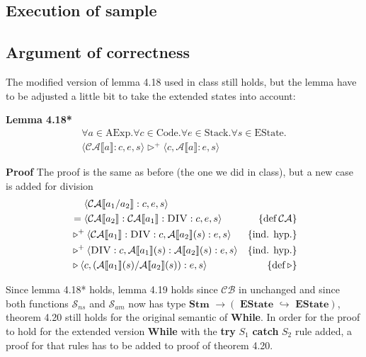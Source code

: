 \documentclass[11pt,oneside,a4paper]{article}
\newenvironment{changemargin}[2]{%
\begin{list}{}{%
\setlength{\topsep}{0pt}%
\setlength{\leftmargin}{#1}%
\setlength{\rightmargin}{#2}%
\setlength{\listparindent}{\parindent}%
\setlength{\itemindent}{\parindent}%
\setlength{\parsep}{\parskip}%
}%
\item[]}{\end{list}}
\begin{document}
\subsection*{Execution of sample}
\begin{changemargin}{-3.4cm}{\rightmargin}
\noindent
\tiny

\normalsize
%
\end{changemargin}

\subsection*{Argument of correctness}
The modified version of lemma 4.18 used in class still holds, 
but the lemma have to be adjusted a little bit to take the 
extended states into account:

{\bf Lemma 4.18*} 
\begin{align*}
\forall a \in \text{AExp}.\forall c \in \text{Code}.\forall e \in \text{Stack}.
\forall s \in \text{EState}. \\
\langle\mathcal{CA}\llbracket a \rrbracket:c, e, s \rangle \triangleright^+ 
\langle c, \mathcal{A}\llbracket a \rrbracket:e, s \rangle
\end{align*}

{\bf Proof}
The proof is the same as before (the one we did in class), 
but a new case is added for division
\begin{align*}
[a \equiv a_1 / a_2]&\:\:\:\:\:\: \langle \mathcal{CA}\llbracket a_1 / a_2 \rrbracket:c,
e, s \rangle \\
&= \langle \mathcal{CA}\llbracket a_2 \rrbracket:\mathcal{CA} \llbracket a_1
\rrbracket:\textsc{DIV}:c, e, s\rangle & \{\text{def}\:\mathcal{CA}\} \\
&\triangleright^+ \langle \mathcal{CA} \llbracket a_1 \rrbracket:\textsc{DIV}:c,
\mathcal{A}\llbracket a_2 \rrbracket(s):e, s \rangle & \{\text{ind. hyp.}\} \\
&\triangleright^+ \langle \textsc{DIV}:c,
\mathcal{A}\llbracket a_1 \rrbracket(s):\mathcal{A}\llbracket a_2 \rrbracket(s):e, 
s \rangle & \{\text{ind. hyp.}\} \\
&\triangleright \langle c, (\mathcal{A}\llbracket a_1 \rrbracket(s) /
\mathcal{A}\llbracket a_2 \rrbracket(s)):e, s \rangle & \{\text{def}\: \triangleright\} \\
\end{align*}

Since lemma 4.18* holds, lemma 4.19 holds since \(\mathcal{CB}\) in unchanged  and since both functions
\(\mathcal{S}_{ns}\) and \(\mathcal{S}_{am}\) now has type \(\textbf{Stm } \rightarrow (\textbf{ EState }
\hookrightarrow \textbf{ EState})\), 
theorem 4.20 still holds for the original semantic of \textbf{While}. In order
for the proof to hold for the extended version \textbf{While} with the {\bf
try} \(S_1\) {\bf catch} \(S_2\) rule added, a proof for that rules has to be
added to proof of theorem 4.20.
\end{document}
